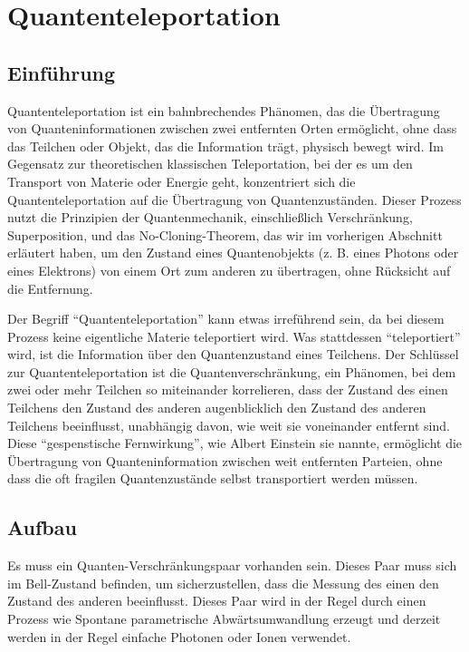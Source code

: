 \section{Quantenteleportation}\label{sec:quantum-teleportation}

\subsection{Einführung}\label{subsec:introduction}
Quantenteleportation ist ein bahnbrechendes Phänomen, das die Übertragung von Quanteninformationen
zwischen zwei entfernten Orten ermöglicht, ohne dass das Teilchen oder Objekt, das die Information trägt, physisch bewegt wird.
Im Gegensatz zur theoretischen klassischen Teleportation, bei der es um den Transport von Materie oder Energie geht,
konzentriert sich die Quantenteleportation auf die Übertragung von Quantenzuständen.
Dieser Prozess nutzt die Prinzipien der Quantenmechanik, einschließlich Verschränkung, Superposition,
und das No-Cloning-Theorem, das wir im vorherigen Abschnitt erläutert haben,
um den Zustand eines Quantenobjekts (z. B. eines Photons oder eines Elektrons) von einem Ort zum anderen zu übertragen,
ohne Rücksicht auf die Entfernung.

Der Begriff ``Quantenteleportation'' kann etwas irreführend sein, da bei diesem Prozess keine eigentliche Materie teleportiert wird.
Was stattdessen ``teleportiert'' wird, ist die Information über den Quantenzustand eines Teilchens.
Der Schlüssel zur Quantenteleportation ist die Quantenverschränkung,
ein Phänomen, bei dem zwei oder mehr Teilchen so miteinander korrelieren, dass der Zustand des einen Teilchens den Zustand des anderen augenblicklich
den Zustand des anderen Teilchens beeinflusst, unabhängig davon, wie weit sie voneinander entfernt sind.
Diese ``gespenstische Fernwirkung'', wie Albert Einstein sie nannte,
ermöglicht die Übertragung von Quanteninformation zwischen weit entfernten Parteien, ohne dass die oft fragilen Quantenzustände selbst transportiert werden müssen.

\subsection{Aufbau}\label{subsec:setup}

Es muss ein Quanten-Verschränkungspaar vorhanden sein.
Dieses Paar muss sich im Bell-Zustand\cite{quantuminfocambridge} befinden, um sicherzustellen, dass die Messung des einen den Zustand des anderen beeinflusst.
Dieses Paar wird in der Regel durch einen Prozess wie
Spontane parametrische Abwärtsumwandlung\cite{couteau2018spontaneous} erzeugt und derzeit
werden in der Regel einfache Photonen oder Ionen verwendet.


